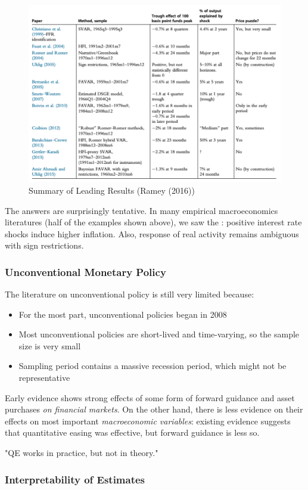                 \begin{figure}[H]
                    \centering
                    \includegraphics[width=5in]{images/ch8/mp_conclusion.png}
                    \caption{Summary of Leading Results (Ramey (2016))}
                \end{figure}
                The answers are surprisingly tentative. In many empirical macroeconomics literatures (half of the examples shown above), we saw the : positive interest rate shocks induce higher inflation. Also, response of real activity remains ambiguous with sign restrictions.
            
            \subsubsection{Unconventional Monetary Policy}

                The literature on unconventional policy is still very limited because:
                \begin{itemize}
                    \item For the most part, unconventional policies began in 2008
                    \item Most unconventional policies are short-lived and time-varying, so the sample size is very small
                    \item Sampling period contains a massive recession period, which might not be representative
                \end{itemize}
                Early evidence shows strong effects of some form of forward guidance and asset purchases \emph{on financial markets}. On the other hand, there is less evidence on their effects on most important \emph{macroeconomic variables}: existing evidence suggests that quantitative easing was effective, but forward guidance is less so.

                "QE works in practice, but not in theory."
                
            \subsubsection{Interpretability of Estimates}
            
        
    